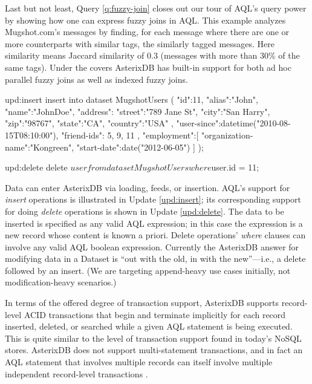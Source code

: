 Last but not least, Query \ref{q:fuzzy-join} closes out our tour of AQL's query power by showing how one can express fuzzy joins in AQL. 
This example analyzes Mugshot.com's messages by finding, for each message where there are one or more counterparts with similar tags, the similarly tagged messages. 
Here similarity means Jaccard similarity of 0.3 (messages with more than 30\% of the same tags). 
Under the covers AsterixDB has built-in support for both ad hoc parallel fuzzy joins as well as indexed fuzzy joins.

\begin{update}{upd:insert}
insert into dataset MugshotUsers
(
  { 
    "id":11, 
    "alias":"John", 
    "name":"JohnDoe", 
    "address":{ 
      "street":"789 Jane St", 
      "city":"San Harry", 
      "zip":"98767", 
      "state":"CA", 
      "country":"USA" 
    }, 
    "user-since":datetime("2010-08-15T08:10:00"), 
    "friend-ids":{{ 5, 9, 11 }}, 
    "employment":[{ 
        "organization-name":"Kongreen", 
        "start-date":date("2012-06-05")
    }]
  }
);
\end{update}


\begin{update}{upd:delete}
delete $user from dataset MugshotUsers 
where $user.id = 11;
\end{update}

Data can enter AsterixDB via loading, feeds, or insertion. AQL's support for \emph{insert} operations is illustrated in Update \ref{upd:insert}; its corresponding support for doing \emph{delete} operations is shown in Update \ref{upd:delete}. 
The data to be inserted is specified as any valid AQL expression; in this case the expression is a new record whose content is known a priori. 
Delete operations' \emph{where} clauses can involve any valid AQL boolean expression. 
Currently the AsterixDB answer for modifying data in a Dataset is ``out with the old, in with the new\!''---i.e., a delete followed by an insert. 
(We are targeting append-heavy use cases initially, not modification-heavy scenarios.)

In terms of the offered degree of transaction support, AsterixDB supports record-level ACID transactions that begin and terminate implicitly for each record inserted, deleted, or searched while a given AQL statement is being executed. 
This is quite similar to the level of transaction support found in today’s NoSQL stores. 
AsterixDB does not support multi-statement transactions, and in fact an AQL statement that involves multiple records can itself involve multiple independent record-level transactions \cite{docs, storage}.


